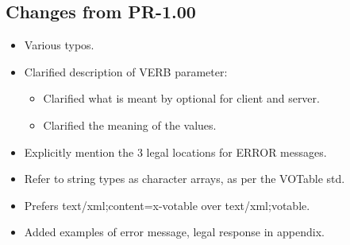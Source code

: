 \documentclass[11pt,a4paper]{ivoa}
\begin{document}
\subsection{Changes from PR-1.00}
\begin{itemize}
	\item Various typos.
	\item Clarified description of VERB parameter:
	\begin{itemize}
		\item Clarified what is meant by optional for client and server.
		\item Clarified the meaning of the values.
	\end{itemize}
	\item Explicitly mention the 3 legal locations for ERROR messages.
	\item Refer to string types as character arrays, as per the VOTable std.
	\item Prefers text/xml;content=x-votable over text/xml;votable.
	\item Added examples of error message, legal response in appendix.
\end{itemize}
\end{document}
